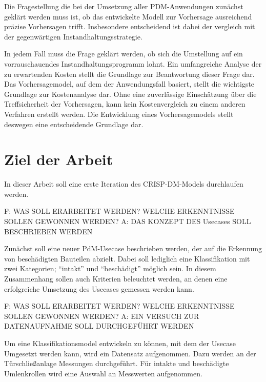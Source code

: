 Die Fragestellung die bei der Umsetzung aller PDM-Anwendungen zunächst geklärt werden muss ist, ob das entwickelte Modell zur Vorhersage ausreichend präzise Vorhersagen trifft. Insbesondere entscheidend ist dabei der vergleich mit der gegenwärtigen Instandhaltungsstrategie.

In jedem Fall muss die Frage geklärt werden, ob sich die Umstellung auf ein vorrauschauendes Instandhaltungsprogramm lohnt. Ein umfangreiche Analyse der zu erwartenden Kosten stellt die Grundlage zur Beantwortung dieser Frage dar. Das Vorhersagemodel, auf dem der Anwendungsfall basiert, stellt die wichtigste Grundlage zur Kostenanalyse dar. Ohne eine zuverlässige Einschätzung über die Treffsicherheit der Vorhersagen, kann kein Kostenvergleich zu einem anderen Verfahren erstellt werden. Die Entwicklung eines Vorhersagemodels stellt deswegen eine entscheidende Grundlage dar. 


\section{Ziel der Arbeit}
\label{sec:ziel}
In dieser Arbeit soll eine erste Iteration des CRISP-DM-Models durchlaufen werden.

F: WAS SOLL ERARBEITET WERDEN? WELCHE ERKENNTNISSE SOLLEN GEWONNEN WERDEN?
A: DAS KONZEPT DES Usecases SOLL BESCHRIEBEN WERDEN

Zunächst soll eine neuer PdM-Usecase beschrieben werden, der auf die Erkennung von beschädigten Bauteilen abzielt. Dabei soll lediglich eine Klassifikation mit zwei Kategorien; \enquote{intakt} und \enquote{beschädigt} möglich sein. In diesem Zusammenhang sollen auch Kriterien beleuchtet werden, an denen eine erfolgreiche Umsetzung des Usecases gemessen werden kann.

F: WAS SOLL ERARBEITET WERDEN? WELCHE ERKENNTNISSE SOLLEN GEWONNEN WERDEN?
A: EIN VERSUCH ZUR DATENAUFNAHME SOLL DURCHGEFÜHRT WERDEN

Um eine Klassifikationsmodel entwickeln zu können, mit dem der Usecase Umgesetzt werden kann, wird ein Datensatz aufgenommen. Dazu werden an der Türschließanlage Messungen durchgeführt. Für intakte und beschädigte Umlenkrollen wird eine Auswahl an Messwerten aufgenommen. 


